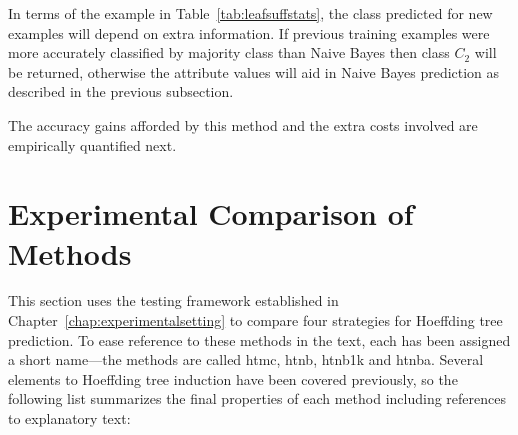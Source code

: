 In terms of the example in Table~\ref{tab:leafsuffstats}, the class predicted for new examples will depend on extra information. If previous training examples were more accurately classified by majority class than Naive Bayes then class $C_{2}$ will be returned, otherwise the attribute values will aid in Naive Bayes prediction as described in the previous subsection.

\BEGINOMIT
The accuracy gains afforded by this method and the extra costs involved are empirically quantified next.


\section{Experimental Comparison of Methods}
\label{sec:leafexp}

This section uses the testing framework established in Chapter~\ref{chap:experimentalsetting} to compare four strategies for Hoeffding tree prediction. To ease reference to these methods in the text, each has been assigned a short name---the methods are called {\sc htmc}, {\sc htnb}, {\sc htnb1k} and {\sc htnba}. Several elements to Hoeffding tree induction have been covered previously, so the following list summarizes the final properties of each method including references to explanatory text:

